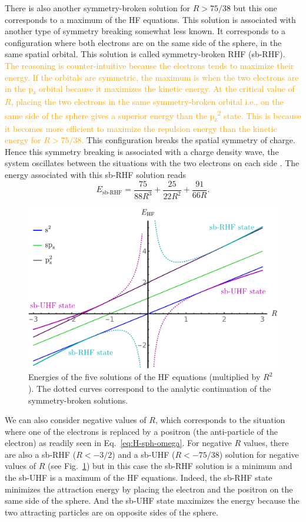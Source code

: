 \documentclass[11pt,a4paper]{article}
\newcommand{\antoine}[1]{\textcolor{orange}{#1}}
\begin{document}
There is also another symmetry-broken solution for $R>75/38$ but this one corresponds to a maximum of the HF equations. This solution is associated with another type of symmetry breaking somewhat less known. It corresponds to a configuration where both electrons are on the same side of the sphere, in the same spatial orbital. This solution is called symmetry-broken RHF (sb-RHF). \antoine{The reasoning is counter-intuitive because the electrons tends to maximize their energy. If the orbitals are symmetric, the maximum is when the two electrons are in the p\textsubscript{z} orbital because it maximizes the kinetic energy. At the critical value of $R$, placing the two electrons in the same symmetry-broken orbital i.e., on the same side of the sphere gives a superior energy than the p\textsubscript{z}\textsuperscript{2} state. This is because it becomes more efficient to maximize the repulsion energy than the kinetic energy for $R>75/38$.}
This configuration breaks the spatial symmetry of charge. Hence this symmetry breaking is associated with a charge density wave, the system oscillates between the situations with the two electrons on each side \cite{GiulianiBook}.
The energy associated with this sb-RHF solution reads
\begin{equation}
E_{\text{sb-RHF}}=\frac{75}{88R^3}+\frac{25}{22R^2}+\frac{91}{66R}.
\end{equation}

\begin{figure}[h!]
    \centering
    \includegraphics[width=0.8\linewidth]{EsbHF.pdf}
    \caption{Energies of the five solutions of the HF equations (multiplied by $R^2$). The dotted curves correspond to the analytic continuation of the symmetry-broken solutions.}
    \label{fig:SpheriumNrj}
\end{figure}

We can also consider negative values of $R$, which corresponds to the situation where one of the electrons is replaced by a positron (the anti-particle of the electron) as readily seen in Eq.~\eqref{eq:H-sph-omega}. For negative $R$ values, there are also a sb-RHF ($R<-3/2$) and a sb-UHF ($R<-75/38$) solution for negative values of $R$ (see Fig.~\ref{fig:SpheriumNrj}) but in this case the sb-RHF solution is a minimum and the sb-UHF is a maximum of the HF equations. Indeed, the sb-RHF state minimizes the attraction energy by placing the electron and the positron on the same side of the sphere. And the sb-UHF state maximizes the energy because the two attracting particles are on opposite sides of the sphere.
\end{document}
